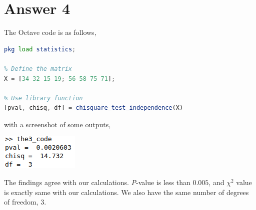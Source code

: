 \documentclass[12pt]{article}
\begin{document}
\section*{Answer 4}

\noindent
The Octave code is as follows,
\begin{lstlisting}[language=Octave]
% Load statistics module for chi-square independence test
pkg load statistics;

% Define the matrix
X = [34 32 15 19; 56 58 75 71];

% Use library function
[pval, chisq, df] = chisquare_test_independence(X)
\end{lstlisting}

\noindent
with a screenshot of some outputs,

\begin{center}
  \includegraphics[scale = 1]{the3_output.png}
\end{center}

The findings agree with our calculations. \textit{P}-value is less than $0.005$,
and $\chi^2$ value is exactly same with our calculations. We also have the same
number of degrees of freedom, $3$.
\end{document}
